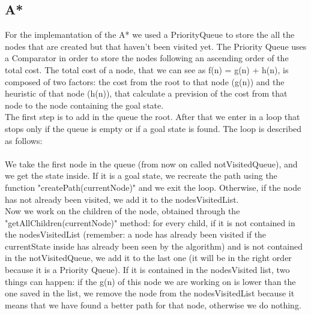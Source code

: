 \documentclass[11pt]{article}
\begin{document}
\subsection{A*}
For the implemantation of the A* we used a PriorityQueue to store the all the nodes that are created but that haven't been visited yet. The Priority Queue uses a Comparator in order to store the nodes following an ascending order of the total cost. The total cost of a node, that we can see as f(n) = g(n) + h(n), is composed of two factors: the cost from the root to that node (g(n)) and the heuristic of that node (h(n)), that calculate a prevision of the cost from that node to the node containing the goal state.\\
The first step is to add in the queue the root. After that we enter in a loop that stops only if the queue is empty or if a goal state is found. The loop is described as follows:
\\
\\
We take the first node in the queue (from now on called notVisitedQueue), and we get the state inside. If it is a goal state, we recreate the path using the function "createPath(currentNode)" and we exit the loop. Otherwise, if the node has not already been visited, we add it to the nodesVisitedList.\\
Now we work on the children of the node, obtained through the "getAllChildren(currentNode)" method: for every child, if it is not contained in the nodesVisitedList (remember: a node has already been visited if the currentState inside has already been seen by the algorithm) and is not contained in the notVisitedQueue, we add it to the last one (it will be in the right order because it is a Priority Queue). If it is contained in the nodesVisited list, two things can happen: if the g(n) of this node we are working on is lower than the one saved in the list, we remove the node from the nodesVisitedList because it means that we have found a better path for that node, otherwise we do nothing.
\end{document}
